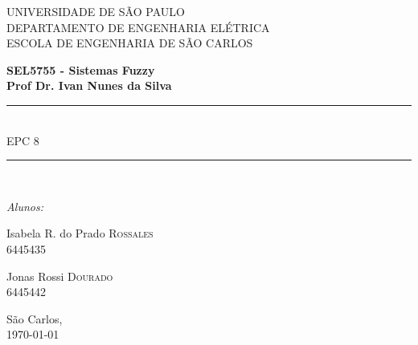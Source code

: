 \documentclass{report}
\begin{document}
\newcommand{\HRule}{\rule{\linewidth}{0.5mm}}
\newcommand{\tsize}[1]{(\frac{W}{L})_{#1}}
 

\begin{titlepage}

\begin{center}


{\LARGE UNIVERSIDADE DE SÃO PAULO\\}
{\LARGE DEPARTAMENTO DE ENGENHARIA ELÉTRICA \\}
{\LARGE ESCOLA DE ENGENHARIA DE SÃO CARLOS\\[4cm]}

\textbf{\large SEL5755 - Sistemas Fuzzy}\\[1cm]
\textbf{\large Prof Dr. Ivan Nunes da Silva}\\[2cm]


\HRule \\[0.6cm]
{ \huge EPC 8\bfseries }\\[0.6cm]

\HRule \\[2cm]


\begin{center} \large
\emph{Alunos:}\\
\end{center}

\begin{minipage}{0.4\textwidth}
\begin{flushleft} \large
Isabela R. do Prado \textsc{Rossales}\\
6445435
\end{flushleft}
\end{minipage}
\begin{minipage}{0.4\textwidth}
\begin{flushright} \large
Jonas Rossi \textsc{Dourado}\\
6445442
\end{flushright}
\end{minipage}

\vfill

{\large São Carlos,\\ \today}

\end{center}

\end{titlepage}
\end{document}
